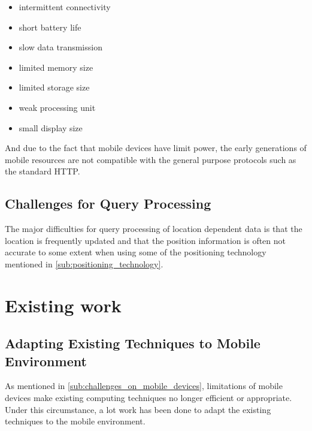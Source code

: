 \documentclass[12pt,a4paper,titlepage]{article}
\begin{document}
\begin{itemize}
	\item intermittent connectivity
	\item short battery life
	\item slow data transmission
	\item limited memory size
	\item limited storage size
	\item weak processing unit
	\item small display size
\end{itemize}

And due to the fact that mobile devices have limit power, the early generations of mobile resources are not compatible with the general purpose protocols such as the standard HTTP.

\subsection{Challenges for Query Processing} %
\label{sub:challenges_for_query_processing}
The major difficulties for query processing of location dependent data is that the location is frequently updated and that the position information is often not accurate to some extent when using some of the positioning technology mentioned in \ref{sub:positioning_technology}.


\section{Existing work} %
\label{sec:existing}

\subsection{Adapting Existing Techniques to Mobile Environment} %
\label{sub:adapting_existing_techniques_to_mobile_environment}
As mentioned in \ref{sub:challenges_on_mobile_devices}, limitations of mobile devices make existing computing techniques no longer efficient or appropriate. Under this circumstance, a lot work has been done to adapt the existing techniques to the mobile environment. \cite{imielinski1993data,imielinski1996introduction,pitoura1998data,jing1999client,ISI:000079296600012}
\end{document}
